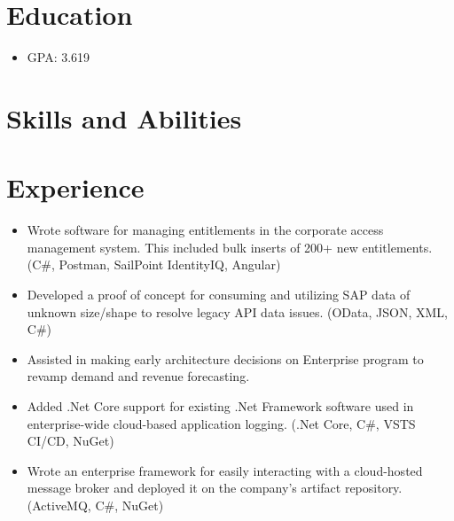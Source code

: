 \documentclass[10pt,letterpaper,sans]{moderncv}   %
\begin{document}
\makecvtitle


\section{Education}
{ {}
\begin{itemize}
    \item GPA: 3.619
\end{itemize}}

\section{Skills and Abilities}


\section{Experience}

{ {}
\begin{itemize}
    \item Wrote software for managing entitlements in the corporate access management system. This included bulk inserts of 200+ new entitlements. (C\#, Postman, SailPoint IdentityIQ, Angular)
    \item Developed a proof of concept for consuming and utilizing SAP data of unknown size/shape to resolve legacy API data issues. (OData, JSON, XML, C\#)
    \item Assisted in making early architecture decisions on Enterprise program to revamp demand and revenue forecasting.
    \item Added .Net Core support for existing .Net Framework software used in enterprise-wide cloud-based application logging. (.Net Core, C\#, VSTS CI/CD, NuGet)
    \item Wrote an enterprise framework for easily interacting with a cloud-hosted message broker and deployed it on the company’s artifact repository. (ActiveMQ, C\#, NuGet)
\end{itemize}}
\end{document}
